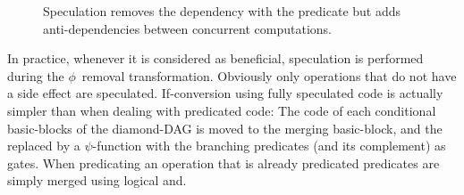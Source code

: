 \begin{figure}[h]
\hfill
{}\hfill
{}\hfill
{}
\caption{\label{fig:pred_versus_spec}Speculation removes the dependency with the predicate but adds anti-dependencies between concurrent computations.}
\end{figure}

In practice, whenever it is considered as beneficial, speculation is performed during the $\phi$~removal transformation. Obviously only operations that do not have a side effect are speculated. 
If-conversion using fully speculated code is actually simpler than when dealing with predicated code: The code of each conditional basic-blocks of the diamond-DAG is moved to the merging basic-block, and the \phifun replaced by a $\psi$-function with the branching predicates (and its complement) as gates. When predicating an operation that is already predicated predicates are simply merged using logical \textrm{and}.

